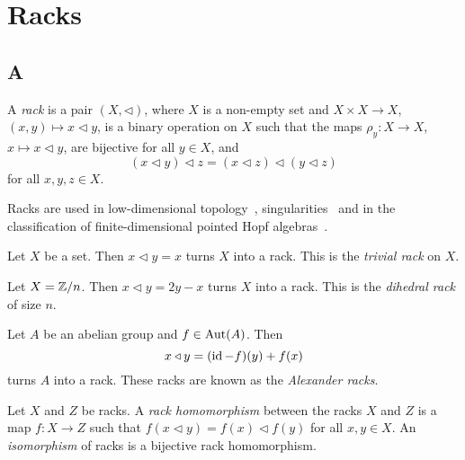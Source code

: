 \chapter{Racks}
\label{racks}

\section*{A}

\begin{definition}
\label{defn:rack}
A \emph{rack} is a pair $(X,\triangleleft)$, 
where $X$ is a non-empty set and 
$X\times X\to X$, $(x,y)\mapsto x\triangleleft y$, is a binary operation on $X$ such that
the maps $\rho_y\colon X\to X$, $x\mapsto x\triangleleft y$, are bijective for all $y\in X$, and 
\begin{equation}
\label{eq:rack}
(x\triangleleft y)\triangleleft z=(x\triangleleft z)\triangleleft (y\triangleleft z)
\end{equation}
for all $x,y,z\in X$.
\end{definition}

Racks are used in low-dimensional topology~\cite{MR3379534}, singularities~\cite{MR975077} 
and in the classification of finite-dimensional pointed Hopf algebras~\cite{MR1994219}.

\begin{example}
    Let $X$ be a set. Then $x\triangleleft y=x$ turns $X$ into a rack. 
    This is the \emph{trivial rack} on $X$. 
\end{example}

\begin{example}
    Let $X=\mathbb{Z}/n$. Then $x\triangleleft y=2y-x$ turns $X$ into a rack. This is 
    the \emph{dihedral rack} of size $n$. 
\end{example}

\begin{example}
    Let $A$ be an abelian group and $f\in\operatorname{Aut}(A)$. Then 
    \[
    x\triangleleft y=(\operatorname{id}-f)(y)+f(x)
    \]
    turns $A$ into a rack. These racks 
    are known as the \emph{Alexander racks}.
\end{example}

\begin{definition}
    Let $X$ and $Z$ be racks. 
    A \emph{rack homomorphism} between the racks $X$ and $Z$ is a map $f\colon X\to Z$ such that 
    $f(x\triangleleft y)=f(x)\triangleleft f(y)$ for all $x,y\in X$. 
    An \emph{isomorphism} of racks is a bijective rack homomorphism. 
\end{definition}

